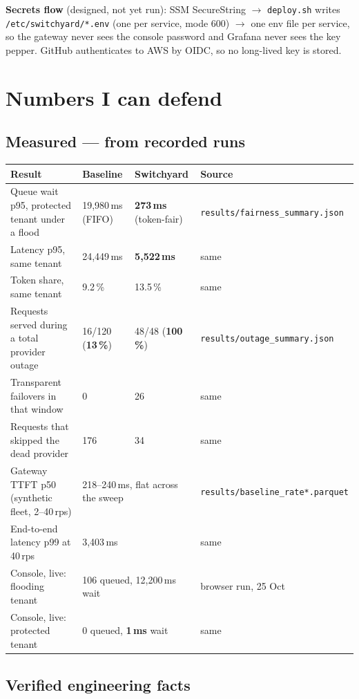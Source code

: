 \documentclass[10pt,a4paper]{article}
\begin{document}
\textbf{Secrets flow} (designed, not yet run): SSM SecureString $\rightarrow$
\texttt{deploy.sh} writes \texttt{/etc/switchyard/*.env} (one per service,
mode 600) $\rightarrow$ one env file per service, so the gateway never sees the
console password and Grafana never sees the key pepper. GitHub authenticates
to AWS by OIDC, so no long-lived key is stored.

\section{Numbers I can defend}

\subsection{Measured — from recorded runs}

\begin{tabularx}{\textwidth}{@{}p{52mm}p{30mm}p{30mm}X@{}}
\toprule
\textbf{Result} & \textbf{Baseline} & \textbf{Switchyard} & \textbf{Source} \\
\midrule
Queue wait p95, protected tenant under a flood & 19{,}980\,ms (FIFO) &
  \textbf{273\,ms} (token-fair) & \texttt{results/fairness\_summary.json} \\
Latency p95, same tenant & 24{,}449\,ms & \textbf{5{,}522\,ms} & same \\
Token share, same tenant & 9.2\,\% & 13.5\,\% & same \\
Requests served during a total provider outage & 16/120 (\textbf{13\,\%}) &
  48/48 (\textbf{100\,\%}) & \texttt{results/outage\_summary.json} \\
Transparent failovers in that window & 0 & 26 & same \\
Requests that skipped the dead provider & 176 & 34 & same \\
Gateway TTFT p50 (synthetic fleet, 2--40\,rps) & \multicolumn{2}{l}{218--240\,ms, flat across the sweep} &
  \texttt{results/baseline\_rate*.parquet} \\
End-to-end latency p99 at 40\,rps & \multicolumn{2}{l}{3{,}403\,ms} & same \\
Console, live: flooding tenant & \multicolumn{2}{l}{106 queued, 12{,}200\,ms wait} &
  browser run, 25 Oct \\
Console, live: protected tenant & \multicolumn{2}{l}{0 queued, \textbf{1\,ms} wait} & same \\
\bottomrule
\end{tabularx}

\subsection{Verified engineering facts}
\end{document}
